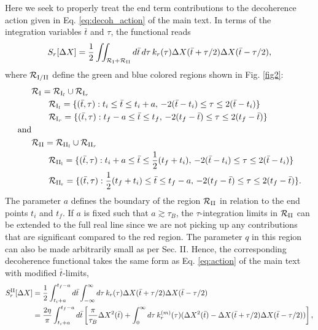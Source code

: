 \documentclass[prl,twocolumn,superscriptaddress,amsmath,amssymb]{revtex4-2}
\def\be{\begin{equation}}
\def\ee{\end{equation}}
\newcommand{\tb}{\bar{t}}
\begin{document}
Here we seek to properly treat the end term contributions to the decoherence action given in Eq. \eqref{eq:decoh_action} of the main text. In terms of the integration variables $\tb$ and $\tau$, the functional reads
\be\label{eq:dec_func_end_terms}
	S_r[\Delta X] = \frac{1}{2}\iint_{\mathcal{R}_{\rm{I}} + \mathcal{R}_{\rm{II}}}d\tb\,d\tau\,k_r(\tau)\Delta X(\tb+\tau/2)\Delta X(\tb-\tau/2),
\ee
where $\mathcal{R}_{\rm{I}/\rm{II}}$ define the green and blue colored regions shown in Fig. \ref{fig2}: 
\begin{align*}
	&\mathcal{R}_{\rm I} = \mathcal{R}_{{\rm I}_l} \cup \mathcal{R}_{{\rm I}_r}\\
	&\qquad \mathcal{R}_{{\rm I}_l} = \{(\tb,\tau) :  t_i\leq \tb\leq t_i+a, \, -2(\tb-t_i)\leq\tau\leq 2(\tb-t_i)\} \\
	&\qquad \mathcal{R}_{{\rm I}_r} = \{(\tb,\tau) :  t_f-a\leq \tb\leq t_f, \, -2(t_f-\tb)\leq\tau\leq 2(t_f-\tb)\} \\
	{\rm and} \\
	&\mathcal{R}_{\rm II} = \mathcal{R}_{{\rm II}_l} \cup \mathcal{R}_{{\rm II}_r}\\
	&\qquad \mathcal{R}_{\rm {II}_l} = \{(\tb,\tau) : t_i+a\leq \tb\leq \frac{1}{2}(t_f+t_i), \, -2(\tb-t_i)\leq\tau\leq 2(\tb-t_i)\}  \\
	&\qquad \mathcal{R}_{\rm {II}_r} = \{(\tb,\tau) : \frac{1}{2}(t_f+t_i)\leq \tb\leq t_f-a, \, -2(t_f-\tb)\leq\tau\leq 2(t_f-\tb)\}.
\end{align*}	
The parameter $a$ defines the boundary of the region $\mathcal{R}_{\rm II}$ in relation to the end points $t_i$ and $t_f$. If $a$ is fixed such that $a\gtrsim\tau_B$, the $\tau$-integration limits in $\mathcal{R}_{\rm II}$ can be extended to the full real line since we are not picking up any contributions that are significant compared to the red region. The parameter $q$ in this region can also be made arbitrarily small as per Sec. II. Hence, the corresponding decoherence functional takes the same form as Eq. \eqref{eq:action} of the main text with modified $\tb$-limits,
\begin{align}
	S^{\rm II}_r[\Delta X] &= \frac{1}{2}\int^{t_f-a}_{t_i+a}d\tb\int^{\infty}_{-\infty}d\tau\,k_r(\tau)\Delta X(\tb+\tau/2)\Delta X(\tb-\tau/2) \nonumber\\
		    &= \frac{2\eta}{\pi}\int^{t_f-a}_{t_i+a}d\tb\left[\frac{\pi}{\tau_B} \Delta X^2(\tb) + \int^{\infty}_0d\tau\,k^{(m)}_r(\tau)(\Delta X^2(\tb) - \Delta X(\tb+\tau/2)\Delta X(\tb-\tau/2))\right],
\end{align}
\end{document}
